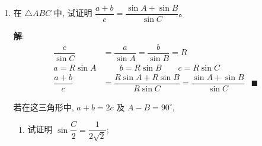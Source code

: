 \documentclass{report}
\newcommand{\sol}{\vspace{0.2cm}\textbf{解}:}
\begin{document}
\begin{enumerate}[leftmargin=*]
    以 $\theta=\dfrac{\pi}{10}$ 代入上式, 证明 $\sin \dfrac{3 \pi}{10}-\sin \dfrac{\pi}{10}=\dfrac{1}{2}$。
    
    [ 提示: 用 $\cos x=\sin \left(\dfrac{\pi}{2}-x\right)$ ]

    \sol{}
    \begin{align*}
        2 \sin ^2 \dfrac{3\pi}{10}-2 \sin ^2 \dfrac{\pi}{10} &= \cos \dfrac{\pi}{5}-\cos \dfrac{3\pi}{5} \\
        2\left(\sin^2 \dfrac{3\pi}{10} - \sin^2 \dfrac{\pi}{10}\right) &= 2\sin \dfrac{2\pi}{5}\sin \dfrac{\pi}{5} \\
        \sin^2 \dfrac{3\pi}{10} - \sin^2 \dfrac{\pi}{10} &= \sin \dfrac{2\pi}{5}\sin \dfrac{\pi}{5} \\
        \left(\sin \dfrac{3\pi}{10} - \sin \dfrac{\pi}{10}\right)\left(\sin \dfrac{3\pi}{10} + \sin \dfrac{\pi}{10}\right) &= \sin \dfrac{2\pi}{5}\sin \dfrac{\pi}{5} \\
        \left(\sin \dfrac{3\pi}{10} - \sin \dfrac{\pi}{10}\right)\left(2\sin\dfrac{\pi}{5}\cos\dfrac{\pi}{10}\right) &= \sin \dfrac{2\pi}{5}\sin \dfrac{\pi}{5} \\
        \left(\sin \dfrac{3\pi}{10} - \sin \dfrac{\pi}{10}\right)\left(2\sin\dfrac{\pi}{5}\sin\dfrac{2\pi}{5}\right) &= \sin \dfrac{2\pi}{5}\sin \dfrac{\pi}{5} \\
        2\left(\sin \dfrac{3\pi}{10} - \sin \dfrac{\pi}{10}\right) &= 1\\
        \sin \dfrac{3\pi}{10} - \sin \dfrac{\pi}{10} &= \dfrac{1}{2} &\blacksquare
    \end{align*}

    \item 在 $\triangle {ABC}$ 中, 试证明 $\dfrac{a+b}{c}=\dfrac{\sin {A}+\sin {B}}{\sin {C}}$。

    \sol{}
    \begin{align*}
        \dfrac{c}{\sin C} &= \dfrac{a}{\sin A} = \dfrac{b}{\sin B} = R\\
        a = R\sin A &\qquad b = R\sin B \qquad c = R\sin C \\
        \dfrac{a+b}{c} &= \dfrac{R\sin A + R\sin B}{R\sin C} = \dfrac{\sin A + \sin B}{\sin C} &\blacksquare
    \end{align*}
    
    \newpage
    若在这三角形中, $a+b=2 c$ 及 ${A}-{B}=90^{\circ}$,
    \begin{enumerate}
        \item 试证明 $\sin \dfrac{C}{2}=\dfrac{1}{2 \sqrt{2}}$;


\end{enumerate}
\end{enumerate}
\end{document}
